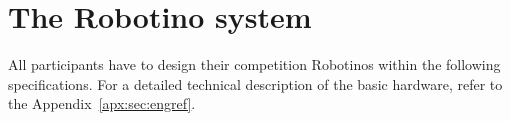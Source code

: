 \documentclass[12pt,twoside]{article}
\newcommand{\mytable}[1]{\savebox{\myt}{#1}\tikz\node[fill=gray!25!white]{\usebox{\myt}};}
\begin{document}
%
%


\section{The Robotino system} \label{sec:robotino}

All participants have to design their competition Robotinos within the
following specifications. For a detailed technical description of the
basic hardware, refer to the Appendix~\ref{apx:sec:engref}.
\end{document}
